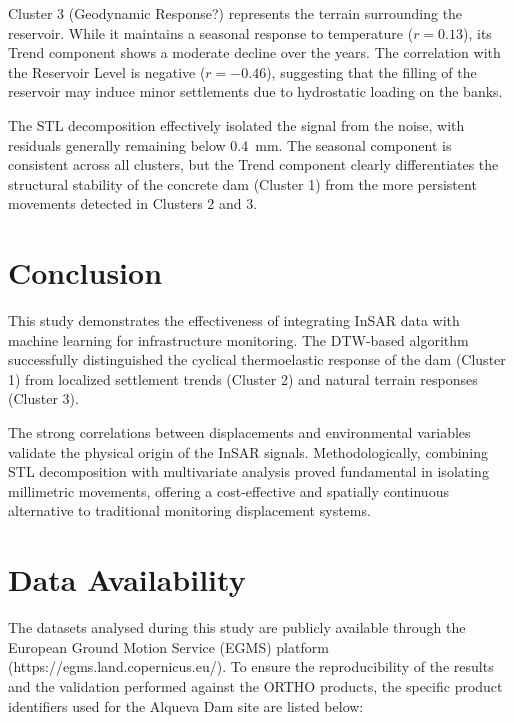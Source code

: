 \documentclass[11pt,a4paper]{article}
\begin{document}
Cluster 3 (Geodynamic Response?) represents the terrain surrounding the reservoir. While it maintains a seasonal response to temperature ($r = 0.13$), its Trend component shows a moderate decline over the years. The correlation with the Reservoir Level is negative ($r = -0.46$), suggesting that the filling of the reservoir may induce minor settlements due to hydrostatic loading on the banks.

The STL decomposition effectively isolated the signal from the noise, with residuals generally remaining below 0.4~mm. The seasonal component is consistent across all clusters, but the Trend component clearly differentiates the structural stability of the concrete dam (Cluster 1) from the more persistent movements detected in Clusters 2 and 3.


\section{Conclusion}

This study demonstrates the effectiveness of integrating InSAR data with machine learning for infrastructure monitoring. The DTW-based algorithm successfully distinguished the cyclical thermoelastic response of the dam (Cluster 1) from localized settlement trends (Cluster 2) and natural terrain responses (Cluster 3).

The strong correlations between displacements and environmental variables validate the physical origin of the InSAR signals. Methodologically, combining STL decomposition with multivariate analysis proved fundamental in isolating millimetric movements, offering a cost-effective and spatially continuous alternative to traditional monitoring displacement systems.




\section*{Data Availability}

The datasets analysed during this study are publicly available through the European Ground Motion Service (EGMS) platform (https://egms.land.copernicus.eu/). To ensure the reproducibility of the results and the validation performed against the ORTHO products, the specific product identifiers used for the Alqueva Dam site are listed below:
\end{document}
